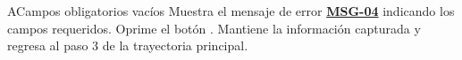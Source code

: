 \begin{UCtrayectoriaA}{A}{Campos obligatorios vacíos}
	\UCpaso Muestra el mensaje de error \hyperlink{mMSG04}{\bf MSG-04} indicando los campos requeridos.
	\UCpaso[\UCactor] Oprime el botón .
	\UCpaso Mantiene la información capturada y regresa al paso 3 de la trayectoria principal.
\end{UCtrayectoriaA}

